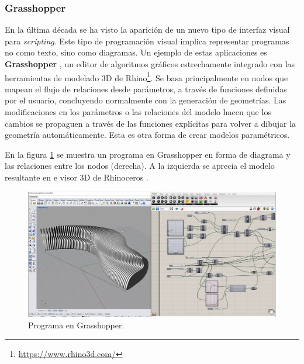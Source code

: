 \subsubsection{Grasshopper} 
En la última década se ha visto la aparición de un nuevo tipo de interfaz visual para \textit{scripting}. Este tipo de programación visual implica representar programas no como texto, sino como diagramas. Un ejemplo de estas aplicaciones es \textbf{\Gls{Grasshopper}} \citep{BobMcNeel}, un editor de algoritmos gráficos estrechamente integrado con las herramientas de modelado 3D de \Gls{Rhino}\footnote{\url{https://www.rhino3d.com/}}. Se basa principalmente en nodos que mapean el flujo de relaciones desde parámetros, a través de funciones definidas por el usuario, concluyendo normalmente con la generación de geometrías. Las modificaciones en los parámetros o las relaciones del modelo hacen que los cambios se propaguen a través de las funciones explícitas para volver a dibujar la geometría automáticamente. Esta es otra forma de crear modelos paramétricos.

En la figura \ref{fig:grass} se muestra un programa en Grasshopper en forma de diagrama y las relaciones entre los nodos (derecha). A la izquierda se aprecia el modelo resultante en e visor 3D de Rhinoceros \citep{DanielParametric}.

\begin{figure}[h]
\includegraphics[width=14cm]{Img/CPD/cpd-grass.jpg}
\centering
\caption{\footnotesize{Programa en Grasshopper.}}
\label{fig:grass}
\end{figure}



